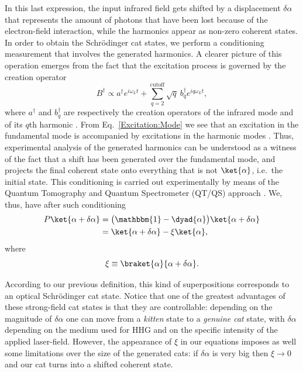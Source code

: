 In this last expression, the input infrared field gets shifted by a displacement $\delta \alpha$ that represents the amount of photons that have been lost because of the electron-field interaction, while the harmonics appear as non-zero coherent states. In order to obtain the Schrödinger cat states, we perform a conditioning measurement that involves the generated harmonics. A clearer picture of this operation emerges from the fact that the excitation process is governed by the creation operator
\begin{equation}\label{Excitation:Mode}
    B^\dagger \propto a^\dagger e^{i\omega_L t} + \sum_{q=2}^\text{cutoff} \sqrt{q} \ b^\dagger_qe^{iq\omega_L t},
\end{equation}
where $a^\dagger$ and $b_q^\dagger$
are respectively the creation operators of the infrared mode and of its $q$th harmonic \cite{Lewenstein2020}. From Eq.~\eqref{Excitation:Mode} we see that an excitation in the fundamental mode is accompanied by excitations in the harmonic modes \cite{Gonoskov2016, Tsatrafyllis2017}. Thus, experimental analysis of the generated harmonics can be understood as a witness of the fact that a shift has been generated over the fundamental mode, and projects the final coherent state onto everything that is not $\ket{\alpha}$, i.e.~the initial state. This conditioning is carried out experimentally by means of the Quantum Tomography and Quantum Spectrometer (QT/QS) approach \cite{Lewenstein2020,Tsatrafyllis2017}. We, thus, have after such conditioning
\begin{equation}\label{Cat:HHG}
    \begin{aligned}
    P\ket{\alpha + \delta \alpha}
        &= \big(\mathbbm{1} - \dyad{\alpha}\big)\ket{\alpha + \delta \alpha}\\
        &= \ket{\alpha + \delta \alpha} 
            - \xi \ket{\alpha},
    \end{aligned}
\end{equation}
where
\begin{equation}
    \xi \equiv \braket{\alpha}{\alpha + \delta\alpha}.
\end{equation}

According to our previous definition, this kind of superpositions corresponds to an optical Schrödinger cat state. Notice that one of the greatest advantages of these strong-field cat states is that they are controllable: depending on the magnitude of $\delta \alpha$ one can move from a \emph{kitten} state to a \emph{genuine cat} state, with $\delta \alpha$ depending on the medium used for HHG and on the specific intensity of the applied laser-field. However, the appearance of $\xi$ in our equations imposes as well some limitations over the size of the generated cats: if $\delta \alpha$ is very big then $\xi \to 0$ and our cat turns into a shifted coherent state. 

